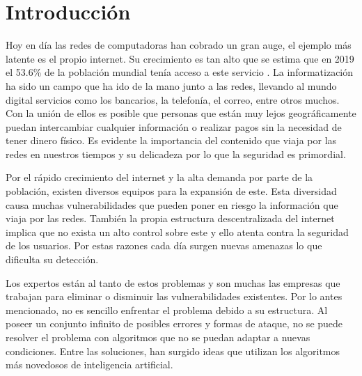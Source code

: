 \chapter*{Introducción}\label{chapter:introduction}




Hoy en día las redes de computadoras han cobrado un gran auge, el ejemplo más latente es el propio internet. Su crecimiento es tan alto que se estima que en 2019 el 53.6\% de la población mundial tenía acceso a este servicio \cite{internetAcces}. La informatización ha sido un campo que ha ido de la mano junto a las redes, llevando al mundo digital servicios como los bancarios, la telefonía, el correo, entre otros muchos. Con la unión de ellos es posible que personas que están muy lejos geográficamente puedan intercambiar cualquier información o realizar pagos sin la necesidad de tener dinero físico. Es evidente la importancia del contenido que viaja por las redes en nuestros tiempos y su delicadeza por lo que la seguridad es primordial.

Por el rápido crecimiento del internet y la alta demanda por parte de la población, existen diversos equipos para la expansión de este. Esta diversidad causa muchas vulnerabilidades que pueden poner en riesgo la información que viaja por las redes. También la propia estructura descentralizada del internet implica que no exista un alto control sobre este y ello atenta contra la seguridad de los usuarios. Por estas razones cada día surgen nuevas amenazas lo que dificulta su detección.

Los expertos están al tanto de estos problemas y son muchas las empresas que trabajan para eliminar o disminuir las vulnerabilidades existentes. Por lo antes mencionado, no es sencillo enfrentar el problema debido a su estructura. Al poseer un conjunto infinito de posibles errores y formas de ataque, no se puede resolver el problema con algoritmos que no se puedan adaptar a nuevas condiciones. Entre las soluciones, han surgido ideas que utilizan los algoritmos más novedosos de inteligencia artificial.

